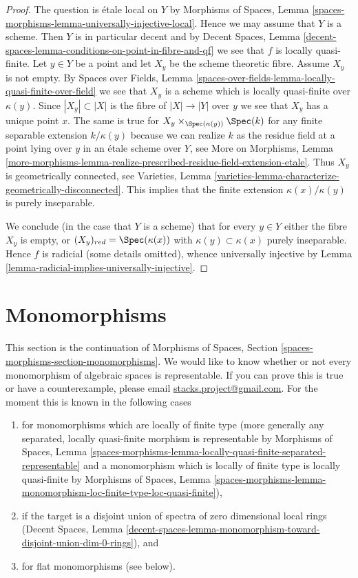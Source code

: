 \begin{proof}
The question is \'etale local on $Y$ by
Morphisms of Spaces, Lemma
\ref{spaces-morphisms-lemma-universally-injective-local}.
Hence we may assume that $Y$ is a scheme.
Then $Y$ is in particular decent and by Decent Spaces, Lemma
\ref{decent-spaces-lemma-conditions-on-point-in-fibre-and-qf}
we see that $f$ is locally quasi-finite.
Let $y \in Y$ be a point and let $X_y$ be the scheme theoretic
fibre. Assume $X_y$ is not empty. By Spaces over Fields, Lemma
\ref{spaces-over-fields-lemma-locally-quasi-finite-over-field}
we see that $X_y$ is a scheme which is locally quasi-finite over
$\kappa(y)$. Since $|X_y| \subset |X|$ is the fibre of $|X| \to |Y|$
over $y$ we see that $X_y$ has a unique point $x$. The same is true
for $X_y \times_{\Spec(\kappa(y))} \Spec(k)$ for any
finite separable extension $k/\kappa(y)$
because we can realize $k$ as the residue field at a point
lying over $y$ in an \'etale scheme over $Y$,
see More on Morphisms, Lemma
\ref{more-morphisms-lemma-realize-prescribed-residue-field-extension-etale}.
Thus $X_y$ is geometrically connected, see
Varieties, Lemma \ref{varieties-lemma-characterize-geometrically-disconnected}.
This implies that the finite extension $\kappa(x)/\kappa(y)$
is purely inseparable.

\medskip\noindent
We conclude (in the case that $Y$ is a scheme)
that for every $y \in Y$ either the fibre $X_y$ is empty,
or $(X_y)_{red} = \Spec(\kappa(x))$ with
$\kappa(y) \subset \kappa(x)$ purely inseparable.
Hence $f$ is radicial (some details omitted), whence universally injective by
Lemma \ref{lemma-radicial-implies-universally-injective}.
\end{proof}




\section{Monomorphisms}
\label{section-monomorphisms}

\noindent
This section is the continuation of
Morphisms of Spaces, Section \ref{spaces-morphisms-section-monomorphisms}.
We would like to know whether or not every monomorphism of algebraic
spaces is representable. If you can prove this is true or have a
counterexample, please email
\href{mailto:stacks.project@gmail.com}{stacks.project@gmail.com}.
For the moment this is known in the following cases
\begin{enumerate}
\item for monomorphisms which are locally of finite type
(more generally any separated, locally quasi-finite morphism
is representable by Morphisms of Spaces, Lemma
\ref{spaces-morphisms-lemma-locally-quasi-finite-separated-representable}
and a monomorphism which is locally of finite type is
locally quasi-finite by Morphisms of Spaces, Lemma
\ref{spaces-morphisms-lemma-monomorphism-loc-finite-type-loc-quasi-finite}),
\item if the target is a disjoint union of spectra of zero dimensional
local rings (Decent Spaces, Lemma
\ref{decent-spaces-lemma-monomorphism-toward-disjoint-union-dim-0-rings}), and
\item for flat monomorphisms (see below).
\end{enumerate}

